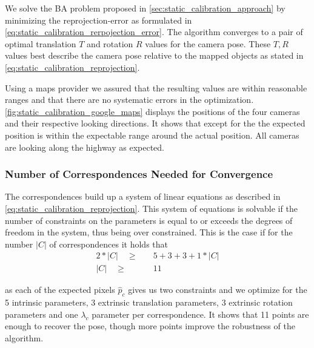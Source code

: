 We solve the BA problem proposed in \autoref{sec:static_calibration_approach} by minimizing the reprojection-error as formulated in \autoref{eq:static_calibration_rerpojection_error}.
The algorithm converges to a pair of optimal translation $T$ and rotation $R$ values for the camera pose.
These $T, R$ values best describe the camera pose relative to the mapped objects as stated in \autoref{eq:static_calibration_reprojection}.

Using a maps provider we assured that the resulting values are within reasonable ranges and that there are no systematic errors in the optimization.
\autoref{fig:static_calibration_google_maps} displays the positions of the four cameras and their respective looking directions. 
It shows that except for the  the expected position is within the expectable range around the actual position.
All cameras are looking along the highway as expected. 


\subsubsection{Number of Correspondences Needed for Convergence}
\label{sec:static_calibration_number_points}
The correspondences build up a system of linear equations as described in \autoref{eq:static_calibration_reprojection}.
This system of equations is solvable if the number of constraints on the parameters is equal to or exceeds the degrees of freedom in the system, thus being over constrained.
This is the case if for the number $\left\lvert C \right\rvert$ of correspondences it holds that
\begin{equation}
  \begin{split}
  2 * \left\lvert C \right\rvert \quad \geq& \quad 5 + 3 + 3 + 1 * \left\lvert C \right\rvert \\
  \left\lvert C \right\rvert \quad \geq& \quad 11 
\end{split}
\end{equation} 

as each of the expected pixels $\hat{p}_c$ gives us two constraints and we optimize for the 5 intrinsic parameters, 3 extrinsic translation parameters, 3 extrinsic rotation parameters and one $\lambda_c$ parameter per correspondence.
It shows that 11 points are enough to recover the pose, though more points improve the robustness of the algorithm.

